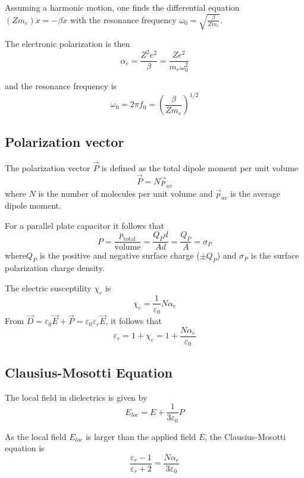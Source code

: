 Assuming a harmonic motion, one finds the differential equation $(Z m_e) \ddot{x} = -\beta\dot{x}$ with the resonance frequency $\omega_0 = \sqrt{\frac{\beta}{Z m_e}}$.

The electronic polarization is then
\begin{equation}
	\alpha_e = \frac{Z^2 e^2}{\beta} = \frac{Z e^2 }{m_e \omega_0^2}
\end{equation}

and the resonance frequency is
\begin{equation}
	\omega_0 = 2 \pi f_0 = \left( \frac{\beta}{Zm_e} \right)^{1/2}
\end{equation}

\subsection{Polarization vector}
The polarization vector $\vec{P}$ is defined as the total dipole moment per unit volume
\begin{equation}
	\vec{P} = N \vec{p}_{av}
\end{equation}
where $N$ is the number of molecules per unit volume and $\vec{p}_{av}$ is the average dipole moment.

For a parallel plate capacitor it follows that
\begin{equation}
	P = \frac{p_{\text{total}}}{\text{volume}} = \frac{Q_P d}{A d} = \frac{Q_P}{A} = \sigma_P
\end{equation}
where$Q_P$ is the positive and negative surface charge ($\pm Q_P$) and $\sigma_P$ is the surface polarization charge density.

The electric susceptility $\chi_e$ is
\begin{equation}
	\chi _e = \frac{1}{\varepsilon_0} N \alpha_e
\end{equation}
From $\vec{D}=\varepsilon_0 \vec{E} + \vec{P} = \varepsilon_0\varepsilon_r \vec{E}$, it follows that
\begin{equation}
	\varepsilon_r  = 1 + \chi_e = 1 + \frac{N \alpha_e}{\varepsilon_0}
\end{equation}

\subsection{Clausius-Mosotti Equation}
The local field in dielectrics is given by
\begin{equation}
	E_{loc} = E + \frac{1}{3 \varepsilon_0} P
\end{equation}

As the local field $E_{loc}$ is larger than the applied field $E$, the Clausius-Mosotti equation is
\begin{equation}
	\frac{\varepsilon_r - 1}{\varepsilon_r+2} = \frac{N \alpha_e}{3 \varepsilon_0}
\end{equation}